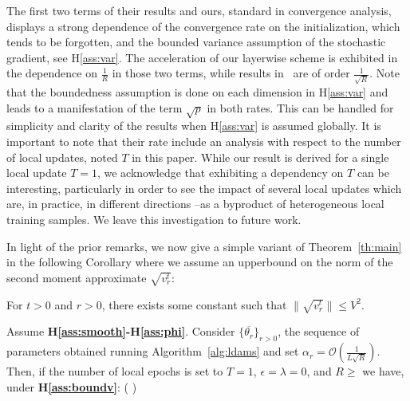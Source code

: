 \documentclass{article}
\begin{document}
The first two terms of their results and ours, standard in convergence analysis, displays a strong dependence of the convergence rate on the initialization, which tends to be forgotten, and the bounded variance assumption of the stochastic gradient, see H\ref{ass:var}.
The acceleration of our layerwise scheme is exhibited in the dependence on $\frac{1}{R}$ in those two terms, while results in~\citet{chen2020toward} are of order $\frac{1}{\sqrt{R}}$.
Note that the boundedness assumption is done on each dimension in H\ref{ass:var} and leads to a manifestation of the term $\sqrt{p}$ in both rates. This can be handled for simplicity and clarity of the results when H\ref{ass:var} is assumed globally.
It is important to note that their rate include an analysis with respect to the number of local updates, noted $T$ in this paper.
While our result is derived for a single local update $T=1$, we acknowledge that exhibiting a dependency on $T$ can be interesting, particularly in order to see the impact of several local updates which are, in practice, in different directions --as a byproduct of heterogeneous local training samples.
We leave this investigation to future work.

\medskip

In light of the prior remarks, we now give a simple variant of Theorem~\ref{th:main} in the following Corollary where we assume an upperbound on the norm of the second moment approximate $\sqrt{ v_r^t}$:

\begin{assumption}\label{ass:boundv}
For $t >0$ and $r>0$, there exists some constant such that $\| \sqrt{ v_r^t} \| \leq V^2 $.
\end{assumption}

\begin{coro}\label{coro:main}
Assume \textbf{H\ref{ass:smooth}-H\ref{ass:phi}}. Consider $\{\overline{\theta_r}\}_{r>0}$, the sequence of parameters obtained running Algorithm~\ref{alg:ldams} and set $\alpha_r = \mathcal{O}(\frac{1}{L \sqrt{R}})$. Then, if the number of local epochs is set to $T=1$, $\epsilon = \lambda = 0$, and $R \geq $  we have, under \textbf{H\ref{ass:boundv}}:
\beq \label{bound1coro}
 \EE{} \leq {}\left(  \right)
\eeq
\end{coro}
\end{document}
